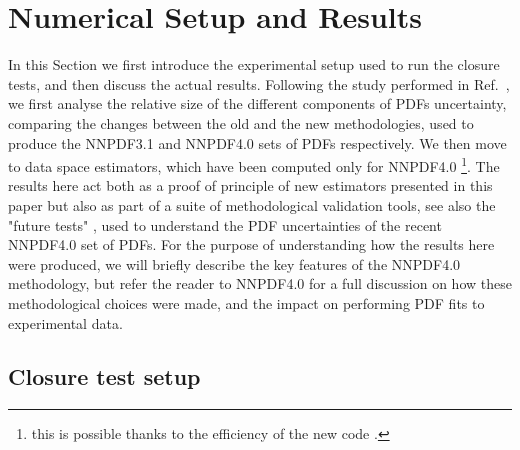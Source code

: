 \section{Numerical Setup and Results}

In this Section we first introduce the experimental setup used to run the
closure tests, and then discuss the actual results. Following the study performed in 
Ref.~\cite{nnpdf30}, we first analyse the relative 
size of the different components of PDFs uncertainty, comparing the changes between the old
and the new methodologies, used to produce the NNPDF3.1 \cite{Ball_2017} and NNPDF4.0 \cite{NNPDF40} 
sets of PDFs respectively. We then move to data space estimators, which have been computed only for NNPDF4.0
\footnote{this is possible thanks to the efficiency of the new code \cite{nnpdf40code}.}.
The results here act both as a proof of principle of new estimators presented in this paper but also
as part of a suite of methodological validation tools, see also the "future
tests" \cite{Cruz_Martinez_2021}, used to understand the PDF uncertainties of
the recent NNPDF4.0 set of PDFs. For the purpose of understanding how the
results here were produced, we will briefly describe the key features of the
NNPDF4.0 methodology, but refer the reader to NNPDF4.0 for a full discussion on
how these methodological choices were made, and the impact on performing PDF
fits to experimental data.

\subsection{Closure test setup}

